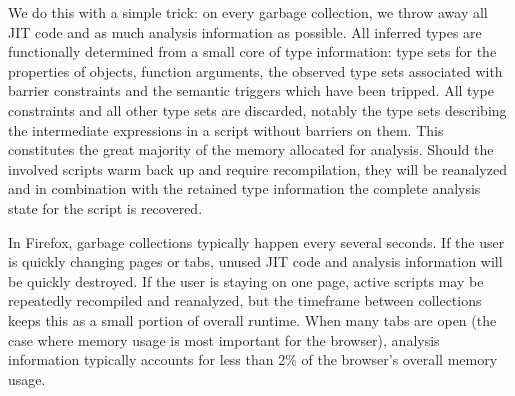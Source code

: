 We do this with a simple trick:
on every garbage collection, we throw away all JIT code and as much analysis
information as possible.
All inferred types are functionally determined from a small core of type
information:
type sets for the properties of objects, function arguments, the observed
type sets associated with barrier constraints and the semantic triggers which
have been tripped.
All type constraints and all other type sets are discarded, notably the type sets
describing the intermediate expressions in a script without barriers on them.
This constitutes the great majority of the memory allocated for analysis.
Should the involved scripts warm back up and require recompilation,
they will be reanalyzed and in combination with the retained type information
the complete analysis state for the script is recovered.

In Firefox, garbage collections typically happen every several seconds.
If the user is quickly changing pages or tabs, unused JIT code and analysis
information will be quickly destroyed.
If the user is staying on one page, active scripts may be repeatedly
recompiled and reanalyzed, but the timeframe between collections keeps this
as a small portion of overall runtime.
When many tabs are open (the case where memory usage is most important
for the browser), analysis information typically accounts
for less than 2\% of the browser's overall memory usage.

